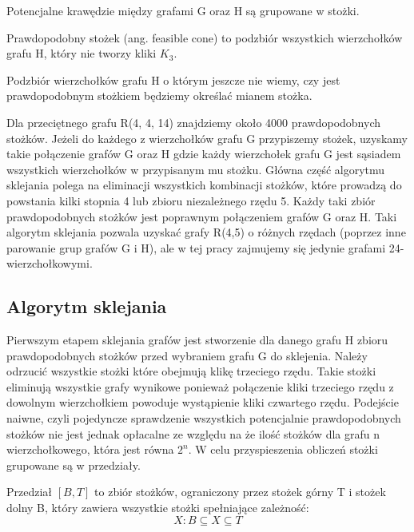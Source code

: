 Potencjalne krawędzie między grafami G oraz H są grupowane w stożki.

\begin{definition}
Prawdopodobny stożek (ang. feasible cone) to podzbiór wszystkich wierzchołków grafu H, który nie tworzy kliki $K_3$\cite{mainpaper}. 
\end{definition}

Podzbiór wierzchołków grafu H o którym jeszcze nie wiemy, czy jest prawdopodobnym stożkiem będziemy  określać mianem stożka.

Dla przeciętnego grafu R(4, 4, 14) znajdziemy około 4000 prawdopodobnych stożków. Jeżeli do każdego z wierzchołków grafu G przypiszemy stożek, uzyskamy takie połączenie grafów G oraz H gdzie każdy wierzchołek grafu G jest sąsiadem wszystkich wierzchołków w przypisanym mu stożku. Główna część algorytmu sklejania polega na eliminacji wszystkich kombinacji stożków, które prowadzą do powstania kilki stopnia 4 lub zbioru niezależnego rzędu 5. Każdy taki zbiór prawdopodobnych stożków jest poprawnym połączeniem grafów G oraz H. Taki algorytm sklejania pozwala uzyskać grafy R(4,5) o różnych rzędach (poprzez inne parowanie grup grafów G i H), ale w tej pracy zajmujemy się jedynie grafami 24-wierzchołkowymi.




\subsection{Algorytm sklejania}
Pierwszym etapem sklejania grafów jest stworzenie dla danego grafu H zbioru prawdopodobnych stożków przed wybraniem grafu G do sklejenia. Należy odrzucić wszystkie stożki które obejmują klikę trzeciego rzędu. Takie stożki eliminują wszystkie grafy wynikowe ponieważ połączenie kliki trzeciego rzędu z dowolnym wierzchołkiem powoduje wystąpienie kliki czwartego rzędu. Podejście naiwne, czyli pojedyncze sprawdzenie wszystkich potencjalnie prawdopodobnych stożków nie jest jednak opłacalne ze względu na że ilość stożków dla grafu n wierzchołkowego, która jest równa $2^n$. W celu przyspieszenia obliczeń stożki grupowane są w przedziały. 

\begin{definition}
Przedział $[B, T]$ to zbiór stożków, ograniczony przez stożek górny T i stożek dolny B, który zawiera wszystkie stożki spełniające zależność:  $$X: B \subseteq X \subseteq T$$ 
\end{definition}


